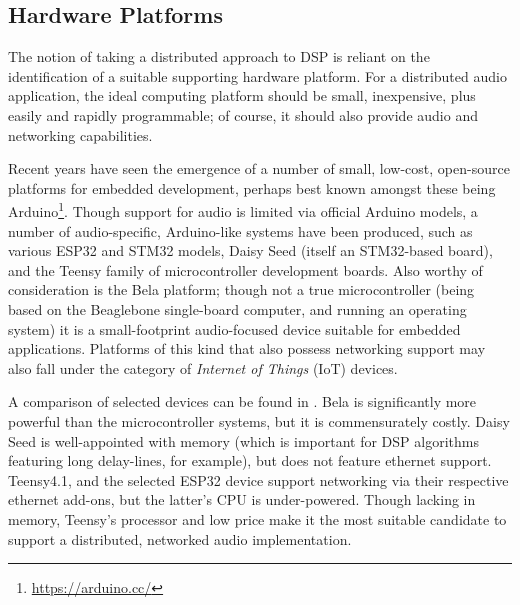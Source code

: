 \subsection{Hardware Platforms}\label{subsec:hardware-platforms}

The notion of taking a distributed approach to DSP is reliant on the
identification of a suitable supporting hardware platform.
For a distributed audio application, the ideal computing platform should be
small, inexpensive, plus easily and rapidly programmable; of course, it should
also provide audio and networking capabilities.

Recent years have seen the emergence of a number of small, low-cost, open-source
platforms for embedded development, perhaps best known amongst these being
Arduino\footnote{\url{https://arduino.cc/}}.
Though support for audio is limited via official Arduino models, a number of
audio-specific, Arduino-like systems have been produced, such as various
ESP32 and STM32 models, Daisy Seed (itself an STM32-based board), and the Teensy
family of microcontroller development boards.
Also worthy of consideration is the Bela platform; though not a true
microcontroller (being based on the Beaglebone single-board computer, and
running an operating system) it is a small-footprint audio-focused device
suitable for embedded applications.
Platforms of this kind that also possess networking support may also fall
under the category of \textit{Internet of Things} (IoT) devices.

A comparison of selected devices can be found in
.
Bela is significantly more powerful than the microcontroller systems, but it is
commensurately costly.
Daisy Seed is well-appointed with memory (which is important for DSP algorithms
featuring long delay-lines, for example), but does not feature ethernet support.
Teensy4.1, and the selected ESP32 device support networking via their
respective ethernet add-ons, but the latter's CPU is under-powered.
Though lacking in memory, Teensy's processor and low price make it the most
suitable candidate to support a distributed, networked audio implementation.

